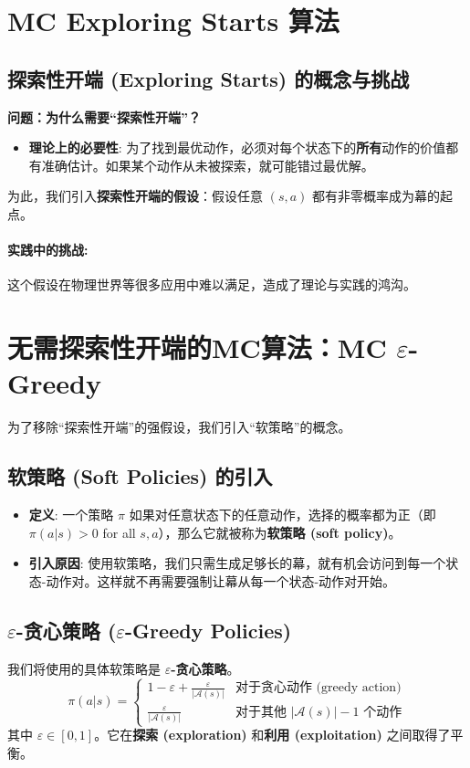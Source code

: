 \documentclass[12pt, a4paper]{article}
\begin{document}
\section{MC Exploring Starts 算法}
\subsection{探索性开端 (Exploring Starts) 的概念与挑战}
\textbf{问题：为什么需要“探索性开端”？}
\begin{itemize}
    \item \textbf{理论上的必要性}: 为了找到最优动作，必须对每个状态下的\textbf{所有}动作的价值都有准确估计。如果某个动作从未被探索，就可能错过最优解。
\end{itemize}
为此，我们引入\textbf{探索性开端的假设}：假设任意 $(s,a)$ 都有非零概率成为幕的起点。
\paragraph{实践中的挑战:} 这个假设在物理世界等很多应用中难以满足，造成了理论与实践的鸿沟。

\section{无需探索性开端的MC算法：MC \texorpdfstring{$\varepsilon$}{epsilon}-Greedy}
为了移除“探索性开端”的强假设，我们引入“软策略”的概念。

\subsection{软策略 (Soft Policies) 的引入}
\begin{itemize}
    \item \textbf{定义}: 一个策略 $\pi$ 如果对任意状态下的任意动作，选择的概率都为正（即 $\pi(a|s) > 0$ for all $s,a$），那么它就被称为\textbf{软策略 (soft policy)}。
    \item \textbf{引入原因}: 使用软策略，我们只需生成足够长的幕，就有机会访问到每一个状态-动作对。这样就不再需要强制让幕从每一个状态-动作对开始。
\end{itemize}

\subsection{\texorpdfstring{$\varepsilon$}{epsilon}-贪心策略 (\texorpdfstring{$\varepsilon$}{epsilon}-Greedy Policies)}
我们将使用的具体软策略是 \textbf{$\varepsilon$-贪心策略}。
\[
\pi(a|s) = 
\begin{cases}
    1 - \varepsilon + \frac{\varepsilon}{|\mathcal{A}(s)|} & \text{对于贪心动作 (greedy action)} \\
    \frac{\varepsilon}{|\mathcal{A}(s)|} & \text{对于其他 } |\mathcal{A}(s)|-1 \text{ 个动作}
\end{cases}
\]
其中 $\varepsilon \in [0, 1]$。它在\textbf{探索 (exploration)} 和\textbf{利用 (exploitation)} 之间取得了平衡。
\end{document}
